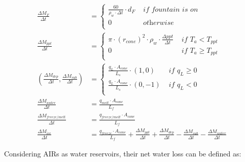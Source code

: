 \begin{subequations}
	\begin{align}
		\frac{\Delta M_{F}}{\Delta t}                                      & = \left\{ \begin{array}{ll} \frac{60}{\rho_w \cdot \Delta t} \cdot d_F
			 & \textit{ if fountain is on} \\ 0 & \textit{ otherwise } \\\end{array} \right.                                             \\
		\label{eq:ppt}
		\frac{\Delta M_{ppt}}{\Delta t}                                    & = \left\{ \begin{array}{ll} \pi \cdot
			{(r_{cone})}^2 \cdot
			\rho_{w}\cdot \frac {\Delta ppt}{\Delta t} & \textit{ if } T_{a} < T_{ppt} \\ 0 & \textit{ if } T_{a} \geq T_{ppt} \\\end{array} \right.                                             \\
		\label{eq:vap}
		(\frac{\Delta M_{dep}}{\Delta t}, \frac{\Delta M_{sub}}{\Delta t}) & = \left\{ \begin{array}{ll} \frac{q_{L}
			\cdot A_{cone}}{L_s}\cdot (1,0)  & \textit{ if } q_{L} \geq 0 \\ \frac{q_{L}
			\cdot A_{cone}}{L_s}\cdot (0,-1) & \textit{ if } q_{L} < 0    \\\end{array} \right.                                             \\
		\label{eq:mwat}
		\frac{\Delta M_{water}}{\Delta t}                                  & = \frac{q_{melt} \cdot A_{cone} }{L_f}                                                   \\
		\label{eq:m_freeze/melt}
		\frac{\Delta M_{freeze/melt}}{\Delta t}                            & = \frac{q_{freeze/melt} \cdot A_{cone} }{L_f}                                            \\
		\label{eq:mcone}
		\frac{\Delta M_{ice}}{\Delta t}                                    & = \frac{q_{freeze}\cdot A_{cone} }{L_f} + \frac{\Delta M_{ppt}}{\Delta t} + \frac{\Delta
			M_{dep}}{\Delta t}- \frac{\Delta M_{sub}}{\Delta t}- \frac{\Delta M_{water}}{\Delta t}
	\end{align}
\end{subequations}

Considering \ac{AIRs} as water reservoirs, their net water loss can be defined as:

